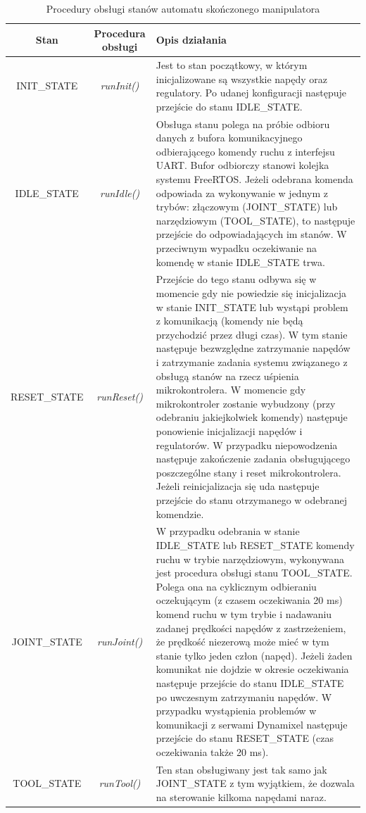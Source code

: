 \documentclass[a4paper, 12pt, twoside]{article}
\begin{document}
\begin{table}[htb!]
\label{handlers}
\begin{center}
\caption{Procedury obsługi stanów automatu skończonego manipulatora}
\begin{tabular}{ | c | c | p{9.5cm} |}
\hline
 Stan & Procedura obsługi & Opis działania \\ 
\hline
 INIT\_STATE & \textit{runInit()} & Jest to stan początkowy, w którym inicjalizowane są wszystkie napędy oraz regulatory. Po udanej konfiguracji następuje przejście do stanu IDLE\_STATE.\\
\hline
 IDLE\_STATE & \textit{runIdle()} & Obsługa stanu polega na próbie odbioru danych z bufora komunikacyjnego odbierającego komendy ruchu z interfejsu UART. Bufor odbiorczy stanowi kolejka systemu FreeRTOS. Jeżeli odebrana komenda odpowiada za wykonywanie w jednym z trybów: złączowym (JOINT\_STATE) lub narzędziowym (TOOL\_STATE), to następuje przejście do odpowiadających im stanów. W przeciwnym wypadku oczekiwanie na komendę w stanie IDLE\_STATE trwa. \\
\hline
 RESET\_STATE & \textit{runReset()} & Przejście do tego stanu odbywa się w momencie gdy nie powiedzie się inicjalizacja w stanie INIT\_STATE lub wystąpi problem z komunikacją (komendy nie będą przychodzić przez długi czas). W tym stanie następuje bezwzględne zatrzymanie napędów i zatrzymanie zadania systemu związanego z obsługą stanów na rzecz uśpienia mikrokontrolera. W momencie gdy mikrokontroler zostanie wybudzony (przy odebraniu jakiejkolwiek komendy) następuje ponowienie inicjalizacji napędów i regulatorów. W przypadku niepowodzenia następuje zakończenie zadania obsługującego poszczególne stany i reset mikrokontrolera. Jeżeli reinicjalizacja się uda następuje przejście do stanu otrzymanego w odebranej komendzie.\\
\hline
 JOINT\_STATE & \textit{runJoint()} & W przypadku odebrania w stanie IDLE\_STATE lub RESET\_STATE komendy ruchu w trybie narzędziowym, wykonywana jest procedura obsługi stanu TOOL\_STATE. Polega ona na cyklicznym odbieraniu oczekującym (z czasem oczekiwania 20 ms) komend ruchu w tym trybie i nadawaniu zadanej prędkości napędów z zastrzeżeniem, że prędkość niezerową może mieć w tym stanie tylko jeden człon (napęd). Jeżeli żaden komunikat nie dojdzie w okresie oczekiwania następuje przejście do stanu IDLE\_STATE po uwczesnym zatrzymaniu napędów. W przypadku wystąpienia problemów w komunikacji z serwami Dynamixel następuje przejście do stanu RESET\_STATE (czas oczekiwania także 20 ms). \\
\hline
 TOOL\_STATE & \textit{runTool()} & Ten stan obsługiwany jest tak samo jak JOINT\_STATE z tym wyjątkiem, że dozwala na sterowanie kilkoma napędami naraz. \\
\hline
\end{tabular}
\end{center}
\end{table}
\end{document}
